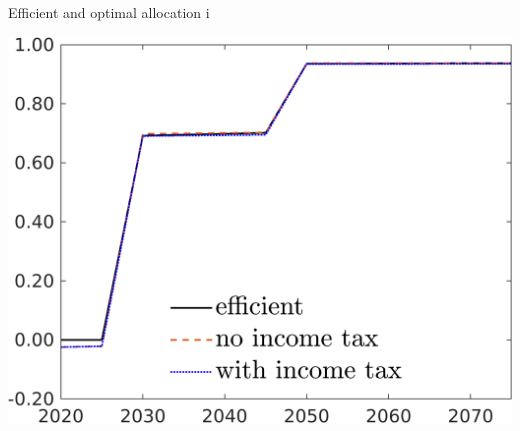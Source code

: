 \documentclass[11pt,aspectratio=169]{beamer}
\begin{document}
\addtocounter{framenumber}{-1}
\begin{frame}{Efficient and optimal allocation i}
	\centering
\begin{minipage}[]{0.32\textwidth}
	\includegraphics[width=1\textwidth]{../codding_model/own_basedOnFried/optimalPol_elastS_DisuSci/figures/all_1705/tauf_CompEffOPT_T_NoTaus_spillover0_noskill0_sep1_BN0_ineq0_red0_xgrowth0_zero0_countec0_etaa0.79_lgd1.png}
\end{minipage}
\begin{minipage}[]{0.05\textwidth}
	\ \ \\ 
	\ \ 
\end{minipage}
\begin{minipage}[]{0.32\textwidth}

\end{minipage}
\end{frame}
\end{document}
